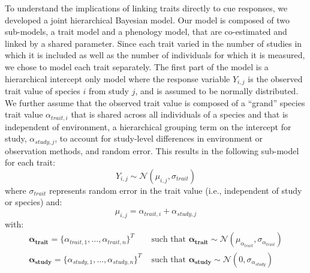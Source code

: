 \documentclass{article}\usepackage[]{graphicx}\usepackage[]{color}
\begin{document}
To understand the implications of linking traits directly to cue responses, we developed a joint hierarchical Bayesian model. Our model is composed of two sub-models, a trait model and a phenology model, that are co-estimated and linked by a shared parameter. Since each trait varied in the number of studies in which it is included as well as the number of individuals for which it is measured, we chose to model each trait separately. The first part of the model is a hierarchical intercept only model where the response variable $Y_{i,j}$ is the observed trait value of species $i$ from study $j$, and is assumed to be normally distributed. We further assume that the observed trait value is composed of a ``grand'' species trait value $\alpha_{trait,i}$ that is shared across all individuals of a species and that is independent of environment, a hierarchical grouping term on the intercept for study, $\alpha_{study,j}$, to account for study-level differences in environment or observation methods, and random error. This results in the following sub-model for each trait:
\begin{equation}
\label{TraitsLine_main}
Y_{i,j} \sim \mathcal{N}( \mu_{i,j}, \sigma_{trait})
\end{equation}
where $\sigma_{trait}$ represents random error in the trait value (i.e., independent of study or species) and:
\begin{equation}
\label{TraitsLine_main2}
\mu_{i,j} = \alpha_{trait,i}+\alpha_{study,j}
\end{equation}
with:
\begin{align}
\boldsymbol{\alpha_{trait}} = \{\alpha_{trait,1}, \ldots, \alpha_{trait,n}\}^T & \text{ such that }
  \boldsymbol{\alpha_{trait}} \sim \mathcal{N}(\mu_{\alpha_{trait}},\sigma_{\alpha_{trait}}) \\
\boldsymbol{\alpha_{study}} = \{\alpha_{study,1}, \ldots, \alpha_{study,n}\}^T & \text{ such that }
  \boldsymbol{\alpha_{study}} \sim \mathcal{N}(0,\sigma_{\alpha_{study}}) \nonumber \\
\end{align}
\end{document}
